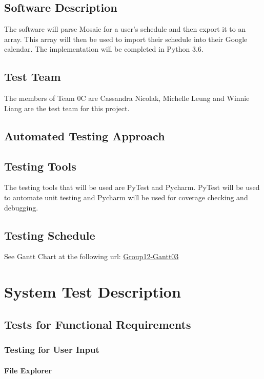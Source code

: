 \documentclass[12pt, titlepage]{article}
\begin{document}
\subsection{Software Description}
The software will parse Mosaic for a user's schedule and then export it to an array. This array will then be used to import their schedule into their Google calendar. The implementation will be completed in Python 3.6.

\subsection{Test Team}
The members of Team 0C are Cassandra Nicolak, Michelle Leung and Winnie Liang are the test team for this project.
\subsection{Automated Testing Approach}

\subsection{Testing Tools}
The testing tools that will be used are PyTest and Pycharm. PyTest will be used to automate unit testing and Pycharm will be used for coverage checking and debugging.

\subsection{Testing Schedule}
See Gantt Chart at the following url: \color{blue}
\href{https://gitlab.cas.mcmaster.ca/liangw15/3XA3Project/blob/master/ProjectSchedule/Group12_Gantt03.pdf}{ Group12-Gantt03}

\color{black}

\section{System Test Description}
	
\subsection{Tests for Functional Requirements}

\subsubsection{Testing for User Input}
		
\paragraph{File Explorer}
\end{document}
